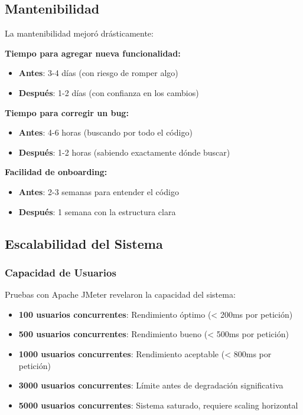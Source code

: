 \subsection{Mantenibilidad}

La mantenibilidad mejoró drásticamente:

\textbf{Tiempo para agregar nueva funcionalidad:}
\begin{itemize}
    \item \textbf{Antes}: 3-4 días (con riesgo de romper algo)
    \item \textbf{Después}: 1-2 días (con confianza en los cambios)
\end{itemize}

\textbf{Tiempo para corregir un bug:}
\begin{itemize}
    \item \textbf{Antes}: 4-6 horas (buscando por todo el código)
    \item \textbf{Después}: 1-2 horas (sabiendo exactamente dónde buscar)
\end{itemize}

\textbf{Facilidad de onboarding:}
\begin{itemize}
    \item \textbf{Antes}: 2-3 semanas para entender el código
    \item \textbf{Después}: 1 semana con la estructura clara
\end{itemize}

\subsection{Escalabilidad del Sistema}

\subsubsection{Capacidad de Usuarios}

Pruebas con Apache JMeter revelaron la capacidad del sistema:

\begin{itemize}
    \item \textbf{100 usuarios concurrentes}: Rendimiento óptimo (< 200ms por petición)
    \item \textbf{500 usuarios concurrentes}: Rendimiento bueno (< 500ms por petición)
    \item \textbf{1000 usuarios concurrentes}: Rendimiento aceptable (< 800ms por petición)
    \item \textbf{3000 usuarios concurrentes}: Límite antes de degradación significativa
    \item \textbf{5000 usuarios concurrentes}: Sistema saturado, requiere scaling horizontal
\end{itemize}

